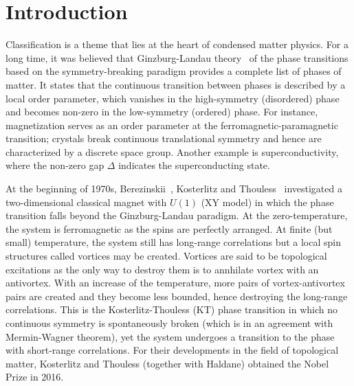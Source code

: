 \chapter{Introduction}
\label{ch:introduction}

Classification is a theme that lies at the heart of condensed matter physics. For a long time, it was believed that Ginzburg-Landau theory~\cite{Landau1950} of the phase transitions based on the symmetry-breaking paradigm provides a complete list of phases of matter. It states that the continuous transition between phases is described by a local order parameter, which vanishes in the high-symmetry (disordered) phase and becomes non-zero in the low-symmetry (ordered) phase. For instance, magnetization serves as an order parameter at the ferromagnetic-paramagnetic transition; crystals break continuous translational symmetry and hence are characterized by a discrete space group. Another example is superconductivity, where the non-zero gap $\Delta$ indicates the superconducting state.

At the beginning of 1970s, Berezinskii~\cite{Berezinsky:1970fr, Berezinsky:1972rfj}, Kosterlitz and Thouless~\cite{Kosterlitz_1972, Kosterlitz_1973} investigated a two-dimensional classical magnet with $U(1)$ (XY model) in which the phase transition falls beyond the Ginzburg-Landau paradigm. At the zero-temperature, the system is ferromagnetic as the spins are perfectly arranged. At finite (but small) temperature, the system still has long-range correlations but a local spin structures called vortices may be created. Vortices are said to be topological excitations as the only way to destroy them is to annhilate vortex with an antivortex. With an increase of the temperature, more pairs of vortex-antivortex pairs are created and they become less bounded, hence destroying the long-range correlations. This is the Kosterlitz-Thouless (KT) phase transition in which no continuous symmetry is spontaneously broken (which is in an agreement with Mermin-Wagner theorem), yet the system undergoes a transition to the phase with short-range correlations. For their developments in the field of topological matter, Kosterlitz and Thouless (together with Haldane) obtained the Nobel Prize in 2016.

